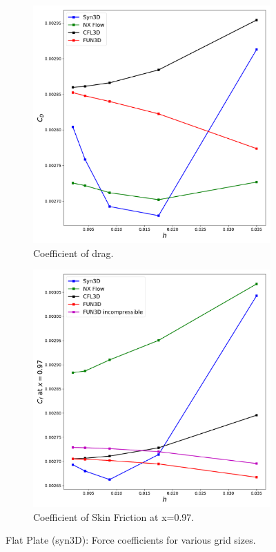 \begin{figure}[ht!]
\centering
\begin{subfigure}{.45\textwidth}
  \centering
  \includegraphics[width=1.0\textwidth]{figs/flat/cd_grid.pdf}
  \caption{Coefficient of drag.}
\end{subfigure}%
\begin{subfigure}{.45\textwidth}
  \centering
  \includegraphics[width=1.0\textwidth]{figs/flat/cf_grid.pdf}
  \caption{Coefficient of Skin Friction at x=0.97.}
\end{subfigure}
\caption{Flat Plate (syn3D): Force coefficients for various grid sizes.}
\label{fig:flatforcestudy}
\end{figure}

